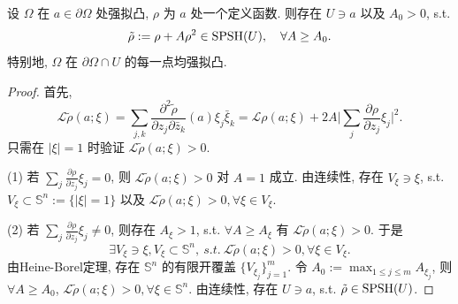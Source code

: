 \begin{lemma}\label{lem3.3}
    设 $\Omega $ 在 $a \in \partial \Omega $ 处强拟凸, $\rho $ 为 $a$ 处一个定义函数. 
    则存在 $U \ni a$ 以及 $A_0>0$, s.t. 
    $$ \tilde{\rho }:=\rho +A \rho ^2 \in \operatorname{SPSH} (U), \quad \forall A \geq A_0. $$  
    特别地, $\Omega $ 在 $\partial \Omega \cap U$ 的每一点均强拟凸.      
\end{lemma}
\begin{proof}
    首先,  
    $$ \mathcal{L}\tilde{\rho }(a;\xi )=\sum_{j,k} \frac{\partial^2 \tilde{\rho }}{\partial z_j \partial \bar{z}_k}(a) \xi _j \bar{\xi }_k=\mathcal{L} \rho (a;\xi )+2A \big|\sum_{j}^{}\frac{\partial \rho }{\partial z_j}\xi _j\big|^2 .$$
    只需在 $\left| \xi  \right| =1$ 时验证 $\mathcal{L}\tilde{\rho }(a;\xi )>0$.
    
    (1) 若 $\sum_{j}^{}\frac{\partial \rho }{\partial z_j}\xi _j=0$, 则 $\mathcal{L}\tilde{\rho} (a;\xi )>0$ 对 $A=1$ 成立. 由连续性, 存在 $V_{\xi } \ni \xi $, s.t. $V_{\xi } \subset \mathbb{S}^n:=\{|\xi |=1\}$ 以及 $\mathcal{L}\tilde{\rho }(a;\xi )>0, \forall \xi \in V_{\xi }$.   
    
    (2) 若 $\sum_{j}^{}\frac{\partial \rho }{\partial z_j}\xi _j \neq  0$, 则存在 $A_{\xi }>1$, s.t. $\forall A \geq A_{\xi }$ 有 $\mathcal{L}\tilde{\rho }(a;\xi )>0$. 
    于是
    $$ \exists V_{\xi } \ni \xi, V_{\xi } \subset \mathbb{S}^n ,~ s.t.~ \mathcal{L}\tilde{\rho }(a;\xi )>0, \forall \xi \in V_{\xi }. $$   
    由Heine-Borel定理, 存在 $\mathbb{S}^n$ 的有限开覆盖 $\{V_{\xi _j}\}_{j=1}^{m}$. 令 $A_0:=\max_{1 \leq j \leq m} A_{\xi _j}$, 则 $\forall A \geq A_0$, $\mathcal{L}\tilde{\rho }(a;\xi )>0, \forall \xi \in \mathbb{S}^n$. 由连续性, 存在 $U \ni a$, s.t. $\tilde{\rho } \in \operatorname{SPSH}(U)$.        
\end{proof}

